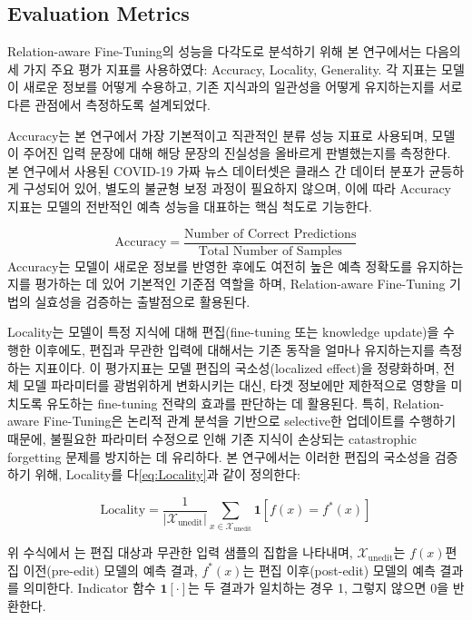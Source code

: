 \documentclass[a4paper,fleqn]{cas-sc}
\begin{document}
\subsection{Evaluation Metrics}

Relation-aware Fine-Tuning의 성능을 다각도로 분석하기 위해 본 연구에서는 다음의 세 가지 주요 평가 지표를 사용하였다: Accuracy, Locality, Generality. 각 지표는 모델이 새로운 정보를 어떻게 수용하고, 기존 지식과의 일관성을 어떻게 유지하는지를 서로 다른 관점에서 측정하도록 설계되었다. 

Accuracy는 본 연구에서 가장 기본적이고 직관적인 분류 성능 지표로 사용되며, 모델이 주어진 입력 문장에 대해 해당 문장의 진실성을 올바르게 판별했는지를 측정한다. 본 연구에서 사용된 COVID-19 가짜 뉴스 데이터셋은 클래스 간 데이터 분포가 균등하게 구성되어 있어, 별도의 불균형 보정 과정이 필요하지 않으며, 이에 따라 Accuracy 지표는 모델의 전반적인 예측 성능을 대표하는 핵심 척도로 기능한다.

\begin{equation}
    \text{Accuracy} = \frac{\text{Number of Correct Predictions}}{\text{Total Number of Samples}}
\end{equation}
Accuracy는 모델이 새로운 정보를 반영한 후에도 여전히 높은 예측 정확도를 유지하는지를 평가하는 데 있어 기본적인 기준점 역할을 하며, Relation-aware Fine-Tuning 기법의 실효성을 검증하는 출발점으로 활용된다.

Locality는 모델이 특정 지식에 대해 편집(fine-tuning 또는 knowledge update)을 수행한 이후에도, 편집과 무관한 입력에 대해서는 기존 동작을 얼마나 유지하는지를 측정하는 지표이다. 이 평가지표는 모델 편집의 국소성(localized effect)을 정량화하며, 전체 모델 파라미터를 광범위하게 변화시키는 대신, 타겟 정보에만 제한적으로 영향을 미치도록 유도하는 fine-tuning 전략의 효과를 판단하는 데 활용된다.
특히, Relation-aware Fine-Tuning은 논리적 관계 분석을 기반으로 selective한 업데이트를 수행하기 때문에, 불필요한 파라미터 수정으로 인해 기존 지식이 손상되는 catastrophic forgetting 문제를 방지하는 데 유리하다. 본 연구에서는 이러한 편집의 국소성을 검증하기 위해, Locality를 다\cref{eq:Locality}과 같이 정의한다:


\begin{equation}
    \text{Locality} = \frac{1}{\left| \mathcal{X}_{\text{unedit}} \right|} \sum_{x \in \mathcal{X}_{\text{unedit}}} \mathbf{1} \left[ f(x) = f^*(x) \right]
    \label{eq:Locality}
\end{equation}
    
위 수식에서 ​는 편집 대상과 무관한 입력 샘플의 집합을 나타내며, \( \mathcal{X}_{\text{unedit}} \)는  $f(x)$편집 이전(pre-edit) 모델의 예측 결과, $f^*(x)$는 편집 이후(post-edit) 모델의 예측 결과를 의미한다. Indicator 함수 $\mathbf{1}[\cdot]$는 두 결과가 일치하는 경우 1, 그렇지 않으면 0을 반환한다.
\end{document}
